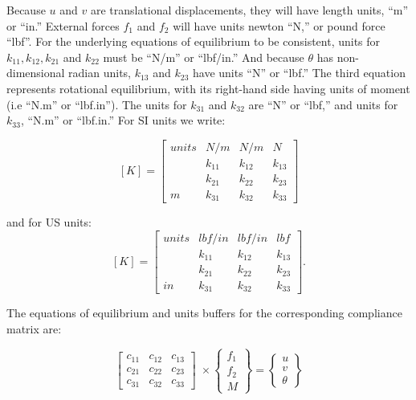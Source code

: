 \vspace{0.15 in}\noindent
Because $u$ and $v$ are translational displacements,
they will have length units, ``m'' or ``in.''
External forces $f_1$ and $f_2$ will have units newton ``N,'' or pound force ``lbf''.
For the underlying equations of equilibrium to be consistent,
units for $k_{11}, k_{12}, k_{21}$ and $k_{22}$ must be ``N/m'' or ``lbf/in.''
And because $\theta$ has non-dimensional radian units,
$k_{13}$ and $k_{23}$ have units  ``N'' or ``lbf.''
The third equation represents rotational equilibrium,
with its right-hand side having units of moment (i.e ``N.m'' or ``lbf.in'').
The units for $k_{31}$ and $k_{32}$ are ``N'' or ``lbf,''
and units for $k_{33}$, ``N.m'' or ``lbf.in.''
For SI units we write:

\[ [K] =  \left [
\begin{array}{rrrr}
units & N/m & N/m & N \\
 \;   &  k_{11} & k_{12} & k_{13} \\
 \;   &  k_{21} & k_{22} & k_{23} \\
 m    & k_{31} & k_{32} & k_{33}
\end{array}
\right] 
\]

\noindent
and for US units:
\[ [K] =  \left [
\begin{array}{rrrr}
units & lbf/in & lbf/in & lbf \\
 \;   &  k_{11} & k_{12} & k_{13} \\
 \;   &  k_{21} & k_{22} & k_{23} \\
 in   &  k_{31} & k_{32} & k_{33}
\end{array}
\right].
 \]

\vspace{0.15 in}\noindent
The equations of equilibrium
and units buffers for the corresponding compliance matrix are:

\[ \left [
\begin{array}{rrr}
 c_{11} & c_{12} & c_{13} \\
 c_{21} & c_{22} & c_{23} \\
 c_{31} & c_{32} & c_{33}
\end{array}
\right] \; \times
\left \{
\begin{array}{r}
 f_1  \\
 f_2 \\
 M
\end{array}
\right \} =
\left \{
\begin{array}{r}
 u  \\
 v \\
 \theta
\end{array}
\right \}
 \]

